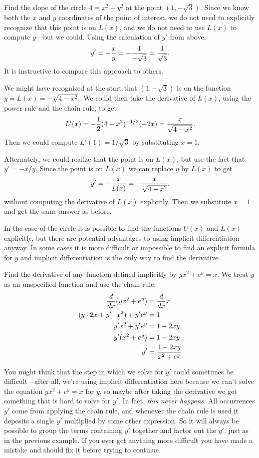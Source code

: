 \begin{example}
Find the slope of the circle $4=x^2+y^2$ at the point
$(1,-\sqrt{3})$. Since we know both the $x$ and $y$ coordinates of the
point of interest, we do not need to explicitly recognize that this
point is on $L(x)$, and we do not need to use $L(x)$ to compute
$y$---but we could. Using the calculation of $y'$ from above, 
$$y'=-{x\over y}=-{1\over -\sqrt{3}}={1\over \sqrt{3}}.$$
It is instructive to compare this approach to others.

We might have recognized at the start that $(1,-\sqrt{3})$ is on the
function $y=L(x)=-\sqrt{4-x^2}$. We could then take the derivative of
$L(x)$, using the power rule and the chain rule, to get
$$L'(x)=-{1\over 2}(4-x^2)^{-1/2}(-2x)={x\over\sqrt{4-x^2}}.$$
Then we could compute $L'(1)=1/\sqrt{3}$ by substituting $x=1$.

Alternately, we could realize that the point is on $L(x)$, but use the
fact that $y'=-x/y$. Since the point is on $L(x)$ we can replace $y$
by $L(x)$ to get
$$y'=-{x\over L(x)}=-{x\over \sqrt{4-x^2}},$$
without computing the derivative of $L(x)$ explicitly. Then we
substitute $x=1$ and get the same answer as before.
\end{example}

In the case of the circle it is possible to find the functions $U(x)$
and $L(x)$ explicitly, but there are potential advantages to using
implicit differentiation anyway. In some cases it is more difficult or
impossible to find an explicit formula for $y$ and implicit
differentiation is the only way to find the derivative.

\begin{example}
Find the derivative of any function defined implicitly by 
$yx^2+e^y=x$. We treat $y$ as an unspecified function and use the
chain rule:
\begin{align*}
{d\over dx}(yx^2+e^y)&={d\over dx}x \\
(y\cdot 2x+y'\cdot x^2)+y'e^y &= 1 \\
y'x^2+y'e^y&= 1-2xy \\
y'(x^2+e^y)&= 1-2xy \\
y'&={1-2xy\over x^2+e^y} \\
\end{align*}
\vskip-18pt\end{example}

You might think that the step in which we solve for $y'$ could
sometimes be difficult---after all, we're using implicit
differentiation here because we can't solve the equation
$yx^2+e^y=x$ for $y$, so maybe after taking the derivative we get
something that is hard to solve for $y'$. In fact, {\it this never
  happens.} All occurrences $y'$ come from applying the chain rule,
and whenever the chain rule is used it deposits a single $y'$
multiplied by some other expression. So it will always be possible to
group the terms containing $y'$ together and factor out the $y'$, just
as in the previous example. If you ever get anything more difficult
you have made a mistake and should fix it before trying to continue.

